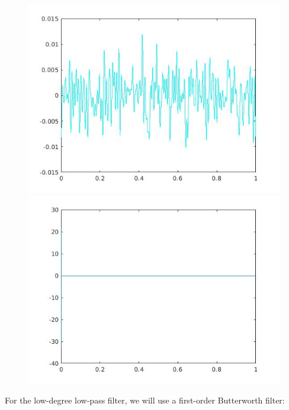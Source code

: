 \documentclass[a4paper,11pt]{article}
\begin{document}
\begin{figure}[!hp]
\centering
\begin{minipage}{.5\textwidth}
  \centering
  \includegraphics[width=1\linewidth]{images/lab1_8.jpg}
\end{minipage}%
\begin{minipage}{.5\textwidth}
  \centering
  \includegraphics[width=1\linewidth]{images/lab1_6.jpg}
\end{minipage}
\end{figure}

\newpage

For the low-degree low-pass filter, we will use a first-order Butterworth filter:
\end{document}
